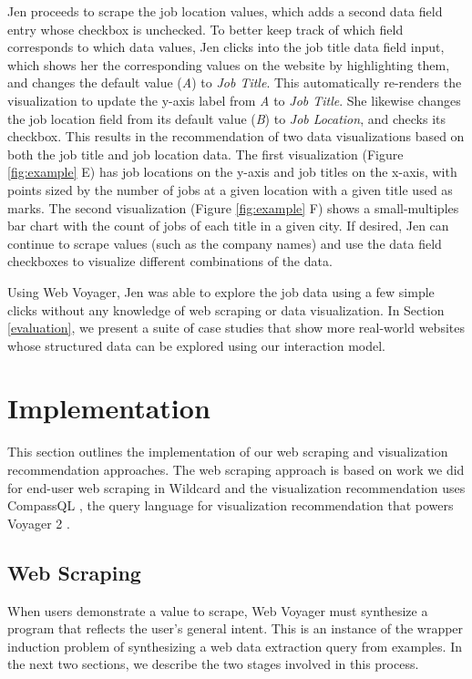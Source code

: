 \documentclass{vgtc}                          %
\begin{document}
Jen proceeds to scrape the job location values, which adds a second data field entry whose checkbox is unchecked. To better keep track of which
field corresponds to which data values, Jen clicks into the job title data field input, which shows her the corresponding values on the website by highlighting
them, and changes the default value (\emph{A}) to \emph{Job Title}. This automatically re-renders the visualization to update the y-axis label from \emph{A} to \emph{Job Title}.
She likewise changes the job location field from its default value (\emph{B}) to \emph{Job Location}, and checks its checkbox. This results in the recommendation of two data
visualizations based on both the job title and job location data. The first visualization (Figure \ref{fig:example} E) has job locations on the y-axis and
job titles on the x-axis, with points sized by the number of jobs at a given location with a given title used as marks. The second visualization
(Figure \ref{fig:example} F) shows a small-multiples bar chart with the count of jobs of each title in a given city. If desired, Jen can continue 
to scrape values (such as the company names) and use the data field checkboxes to visualize different combinations of the data.

Using Web Voyager, Jen was able to explore the job data using a few simple clicks without any knowledge of web scraping or data visualization.
In Section \ref{evaluation}, we present a suite of case studies that show more real-world websites whose structured data can be explored
using our interaction model.

\section{Implementation} \label{implementation}

This section outlines the implementation of our web scraping and visualization recommendation approaches. The web scraping approach is based on work we did for end-user web scraping in Wildcard \cite{litt2020} and the visualization recommendation uses CompassQL \cite{wongsuphasawat2016}, the query language for visualization recommendation that powers Voyager 2 \cite{wongsuphasawat2017}.

\subsection{Web Scraping}

When users demonstrate a value to scrape, Web Voyager must synthesize a program that reflects the user’s general intent. This is an instance of the wrapper induction \cite{kushmerick2000} problem of synthesizing a web data extraction query from examples. In the next two sections, we describe the two stages involved in this process.
\end{document}
